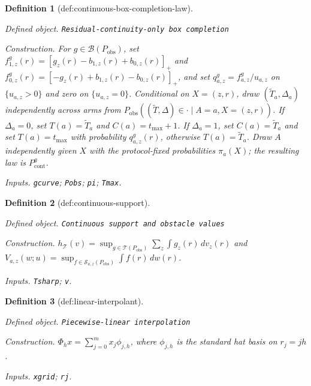 \documentclass{article}
\newtheorem{definition}{Definition}
\begin{document}
\begin{definition}[def:continuous-box-completion-law]\label{def:continuous-box-completion-law}
\par\smallskip\noindent\emph{Defined object.} \texttt{Residual-\allowbreak{}continuity-\allowbreak{}only box completion}
\par\smallskip\noindent\emph{Construction.} For \(g\in\mathcal B(P_{\mathrm{obs}})\), set \(f^g_{1,z}(r)=[g_z(r)-b_{1,z}(r)+b_{0,z}(r)]_+\) and \(f^g_{0,z}(r)=[-g_z(r)+b_{1,z}(r)-b_{0,z}(r)]_+\), and set \(q^g_{a,z}=f^g_{a,z}/u_{a,z}\) on \(\{u_{a,z}>0\}\) and zero on \(\{u_{a,z}=0\}\). Conditional on \(X=(z,r)\), draw \((\widetilde T_a,\Delta_a)\) independently across arms from \(P_{\mathrm{obs}}((\widetilde T,\Delta)\in\cdot\mid A=a,X=(z,r))\). If \(\Delta_a=0\), set \(T(a)=\widetilde T_a\) and \(C(a)=t_{\max}+1\). If \(\Delta_a=1\), set \(C(a)=\widetilde T_a\) and set \(T(a)=t_{\max}\) with probability \(q^g_{a,z}(r)\), otherwise \(T(a)=\widetilde T_a\). Draw \(A\) independently given \(X\) with the protocol-fixed probabilities \(\pi_a(X)\); the resulting law is \(P^g_{\mathrm{cont}}\).
\par\smallskip\noindent\emph{Inputs.} \texttt{gcurve}; \texttt{Pobs}; \texttt{pi}; \texttt{Tmax}.
\end{definition}

\begin{definition}[def:continuous-support]\label{def:continuous-support}
\par\smallskip\noindent\emph{Defined object.} \texttt{Continuous support and obstacle values}
\par\smallskip\noindent\emph{Construction.} \(h_{\mathcal T}(v)=\sup_{g\in\mathcal T(P_{\mathrm{obs}})}\sum_z\int g_z(r)\,dv_z(r)\) and \(V_{a,z}(w;u)=\sup_{f\in\mathcal S_{a,z}(P_{\mathrm{obs}})}\int f(r)\,dw(r)\).
\par\smallskip\noindent\emph{Inputs.} \texttt{Tsharp}; \texttt{v}.
\end{definition}

\begin{definition}[def:linear-interpolant]\label{def:linear-interpolant}
\par\smallskip\noindent\emph{Defined object.} \texttt{Piecewise-\allowbreak{}linear interpolation}
\par\smallskip\noindent\emph{Construction.} \(\Phi_h x=\sum_{j=0}^{m}x_j\phi_{j,h}\), where \(\phi_{j,h}\) is the standard hat basis on \(r_j=jh\).
\par\smallskip\noindent\emph{Inputs.} \texttt{xgrid}; \texttt{rj}.
\end{definition}
\end{document}
